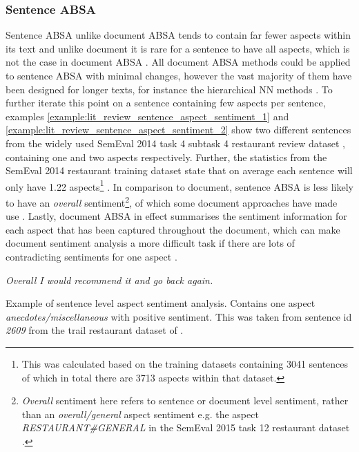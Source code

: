 \subsubsection{Sentence ABSA}
\label{lit_review_sentence_ABSA}

Sentence ABSA unlike document ABSA tends to contain far fewer aspects within its text and unlike document it is rare for a sentence to have all aspects, which is not the case in document ABSA \citep{snyder-barzilay-2007-multiple, Wang2010LatentAR}. All document ABSA methods could be applied to sentence ABSA with minimal changes, however the vast majority of them have been designed for longer texts, for instance the hierarchical NN methods \citep{yin-etal-2017-document, li-etal-2018-document, wang-etal-2019-human}. To further iterate this point on a sentence containing few aspects per sentence, examples \ref{example:lit_review_sentence_aspect_sentiment_1} and \ref{example:lit_review_sentence_aspect_sentiment_2} show two different sentences from the widely used SemEval 2014 task 4 subtask 4 restaurant review dataset \citep{pontiki-etal-2014-semeval}, containing one and two aspects respectively. Further, the statistics from the SemEval 2014 restaurant training dataset state that on average each sentence will only have 1.22 aspects\footnote{This was calculated based on the training datasets containing 3041 sentences of which in total there are 3713 aspects within that dataset.} \citep{pontiki-etal-2014-semeval}. In comparison to document, sentence ABSA is less likely to have an \textit{overall} sentiment\footnote{\textit{Overall} sentiment here refers to sentence or document level sentiment, rather than an \textit{overall/general} aspect sentiment e.g. the aspect \textit{RESTAURANT\#GENERAL} in the SemEval 2015 task 12 restaurant dataset \citep{pontiki-etal-2015-semeval}.}, of which some document approaches have made use \citep{Wang2010LatentAR, li-etal-2018-document}. Lastly, document ABSA in effect summarises the sentiment information for each aspect that has been captured throughout the document, which can make document sentiment analysis a more difficult task if there are lots of contradicting sentiments for one aspect \citep{pontiki-etal-2016-semeval}.  


\begin{example}
\textit{Overall I would recommend it and go back again.}
\caption{Example of sentence level aspect sentiment analysis. Contains one aspect \textit{anecdotes/miscellaneous} with positive sentiment. This was taken from sentence id \textit{2609} from the trail restaurant dataset of \citet{pontiki-etal-2014-semeval}.}
\label{example:lit_review_sentence_aspect_sentiment_1}
\end{example}

